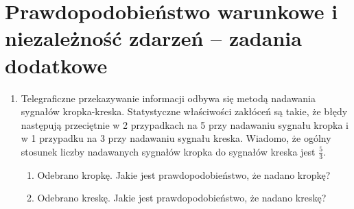 \documentclass{mwart}
\newcommand{\ans}[1]{}
\begin{document}
\section{Prawdopodobieństwo warunkowe i niezależność zdarzeń -- zadania dodatkowe}
\begin{enumerate}
\item Telegraficzne przekazywanie informacji odbywa się metodą nadawania
sygnałów kropka-kreska. Statystyczne właściwości zakłóceń są takie, że błędy
następują przeciętnie w 2 przypadkach na 5 przy nadawaniu sygnału kropka i w 1
przypadku na 3 przy nadawaniu sygnału kreska. Wiadomo, że ogólny stosunek
liczby nadawanych sygnałów kropka do sygnałów kreska jest $\frac{5}{3}$.
\begin{enumerate}
\item Odebrano kropkę. Jakie jest prawdopodobieństwo, że nadano kropkę? \ans{$P(N_\cdot|O_\cdot)=\frac{P(O_\cdot|N_\cdot)P(N_\cdot)}{P(O_\cdot|N_\cdot)P(N_\cdot)+P(O_\cdot|N_-)P(N_-)}=\frac{\frac{3}{5}\frac{5}{8}}{\frac{3}{5}\frac{5}{8}+\frac{1}{3}\frac{3}{8}}=\frac{3}{4}$}
\item Odebrano kreskę. Jakie jest prawdopodobieństwo, że nadano kreskę?
\end{enumerate}


\end{enumerate}
\end{document}
